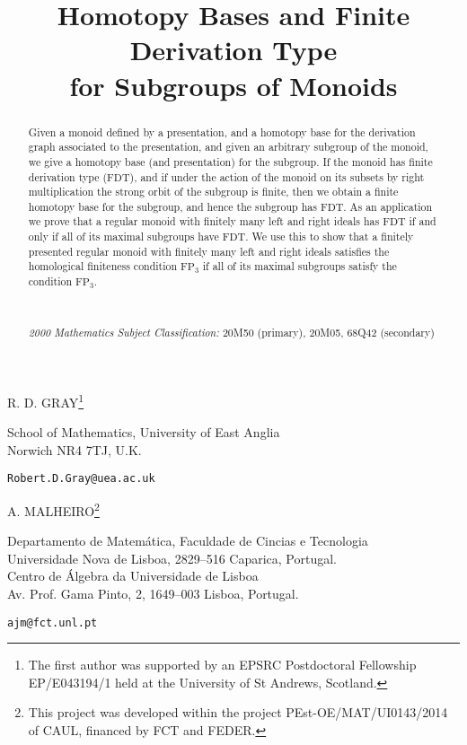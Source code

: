\documentclass[11pt]{amsart}
\theoremstyle{plain}
\begin{document}
\title[Homotopy Bases for Subgroups]{Homotopy Bases and Finite Derivation Type \\ for Subgroups of Monoids}
\maketitle

\begin{center}

    R. D. GRAY\footnote{The first author was supported by an EPSRC Postdoctoral Fellowship EP/E043194/1 held at the University of St Andrews, Scotland.}

    \medskip

    School of Mathematics, University of East Anglia \\ Norwich NR4 7TJ, U.K.

    \medskip

    \texttt{Robert.D.Gray@uea.ac.uk}

    \bigskip

    \bigskip

    A. MALHEIRO\footnote{This project was developed within the project PEst-OE/MAT/UI0143/2014 of CAUL, financed by FCT and FEDER.}

    \medskip

    Departamento de Matem\'{a}tica, Faculdade de Cincias e Tecnologia \\Universidade Nova de Lisboa, 2829--516 Caparica, Portugal. \\ Centro de \'{A}lgebra da Universidade de Lisboa \\ Av. Prof. Gama Pinto, 2, 1649--003 Lisboa, Portugal. 

    \medskip

    \texttt{ajm@fct.unl.pt} \\
\end{center}

\begin{abstract}
Given a monoid defined by a presentation, and a homotopy base for the derivation graph associated to the presentation, and given an arbitrary subgroup of the monoid, we give a homotopy base (and presentation) for the subgroup. If the monoid has finite derivation type ($\mathrm{FDT}$), and if under the action of the monoid on its subsets by right multiplication the strong orbit of the subgroup is finite, then we obtain a finite homotopy base for the subgroup, and hence the subgroup has $\mathrm{FDT}$. As an application we prove that a regular monoid with finitely many left and right ideals has $\mathrm{FDT}$ if and only if all of its maximal subgroups have $\mathrm{FDT}$. We use this to show that a finitely presented regular monoid with finitely many left and right ideals satisfies the homological finiteness condition $\mathrm{FP}_3$ if all of its maximal subgroups satisfy the condition $\mathrm{FP}_3$. 

\

\noindent \textit{2000 Mathematics Subject Classification:} 20M50 (primary),  20M05, 68Q42 (secondary)
\end{abstract}
\end{document}
